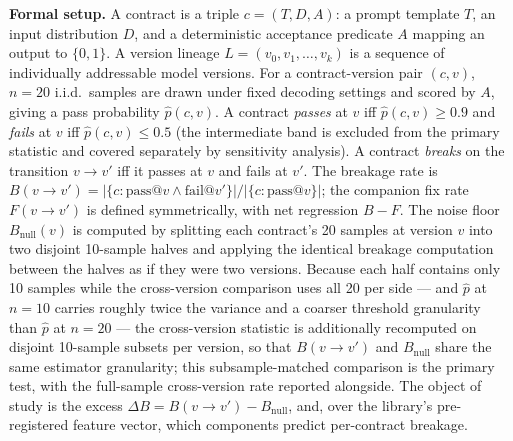 \documentclass[11pt]{article}
\begin{document}
\noindent\textbf{Formal setup.} A contract is a triple $c = (T, D, A)$: a prompt template $T$, an input distribution $D$, and a deterministic acceptance predicate $A$ mapping an output to $\{0,1\}$. A version lineage $L = (v_0, v_1, \dots, v_k)$ is a sequence of individually addressable model versions. For a contract-version pair $(c, v)$, $n = 20$ i.i.d.\ samples are drawn under fixed decoding settings and scored by $A$, giving a pass probability $\hat{p}(c, v)$. A contract \emph{passes} at $v$ iff $\hat{p}(c, v) \geq 0.9$ and \emph{fails} at $v$ iff $\hat{p}(c, v) \leq 0.5$ (the intermediate band is excluded from the primary statistic and covered separately by sensitivity analysis). A contract \emph{breaks} on the transition $v \to v'$ iff it passes at $v$ and fails at $v'$. The breakage rate is $B(v{\to}v') = |\{c : \text{pass}@v \wedge \text{fail}@v'\}| / |\{c : \text{pass}@v\}|$; the companion fix rate $F(v{\to}v')$ is defined symmetrically, with net regression $B - F$. The noise floor $B_{\text{null}}(v)$ is computed by splitting each contract's 20 samples at version $v$ into two disjoint 10-sample halves and applying the identical breakage computation between the halves as if they were two versions. Because each half contains only 10 samples while the cross-version comparison uses all 20 per side --- and $\hat{p}$ at $n = 10$ carries roughly twice the variance and a coarser threshold granularity than $\hat{p}$ at $n = 20$ --- the cross-version statistic is additionally recomputed on disjoint 10-sample subsets per version, so that $B(v{\to}v')$ and $B_{\text{null}}$ share the same estimator granularity; this subsample-matched comparison is the primary test, with the full-sample cross-version rate reported alongside. The object of study is the excess $\Delta B = B(v{\to}v') - B_{\text{null}}$, and, over the library's pre-registered feature vector, which components predict per-contract breakage.
\end{document}
